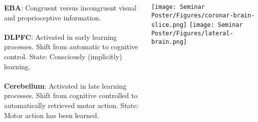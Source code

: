 \documentclass[a0paper,portrait,margin=0pt, colspace=24pt,subcolspace=0pt,blockverticalspace=36pt,innermargin=50pt]{tikzposter}
\begin{document}
\begin{columns}
{	\begin{minipage}{0.5\linewidth}
	    \textbf{EBA}: Congruent versus incongruent visual and proprioceptive information. \\
            \mbox{} \\
            \textbf{DLPFC}: Activated in early learning processes. Shift from automatic to cognitive control. State: Consciously (implicitly) learning. \\
            \mbox{} \\
            \textbf{Cerebellum}: Activated in late learning processes. Shift from cognitive controlled to automatically retrieved motor action. State: Motor action has been learned.
	\end{minipage}
	\begin{minipage}{0.5\linewidth}
	    \texttt{[image: Seminar Poster/Figures/coronar-brain-slice.png]}
            \texttt{[image: Seminar Poster/Figures/lateral-brain.png]}
	\end{minipage}
	
}
\end{columns}
\end{document}
